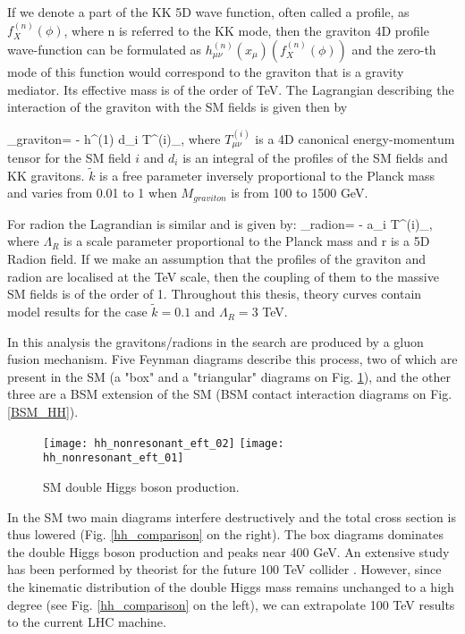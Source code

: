 If we denote a part of the KK 5D wave function, often called a profile, as $f^{(n)}_X(\phi)$, where n is referred to the KK mode, then the graviton 4D profile wave-function can be formulated as $h^{(n)}_{\mu\nu}(x_\mu)(f^{(n)}_X(\phi))$ and the zero-th mode of this function would correspond to the graviton that is a gravity mediator. Its effective mass is of the order of TeV. The Lagrangian describing the interaction of the graviton with the SM fields is given then by 

\beqn\label{lagr_Yuk}
\Lagr_{graviton}=  -  h^{\mu\nu(1)} \times d_i T^{(i)}_{\mu\nu},  
\eeqn
where $T^{(i)}_{\mu\nu}$ is a 4D canonical energy-momentum tensor \cite{Forger:2003ut} for the SM field $i$ and $d_i$ is an integral of the profiles of the SM fields and KK gravitons. $\tilde{k}$ is a free parameter inversely proportional to the Planck mass and varies from 0.01 to 1 when $M_{graviton}$ is from 100 to 1500 GeV. 

For radion the Lagrandian is similar and is given by:
\beqn\label{lagr_Yuk}
\Lagr_{radion}=  -  \times a_i T^{\mu (i)}_{\mu},  
\eeqn
where $\Lambda_R$ is a scale parameter proportional to the Planck mass and r is a 5D Radion field. If we make an assumption that the profiles of the graviton and radion are localised at the TeV scale, then the coupling of them to the massive SM fields is of the order of 1. Throughout this thesis, theory curves contain model results for the case $\tilde{k}=0.1$ and $\Lambda_R = 3 $ TeV.  

In this analysis the gravitons/radions in the search are produced by a gluon fusion mechanism. Five Feynman diagrams describe this process, two of which are present in the SM (a "box" and a "triangular" diagrams on Fig. \ref{SM_HH}), and the other three are a BSM extension of the SM (BSM contact interaction diagrams on Fig. \ref{BSM_HH}).   



\begin{figure}[H]
  \centering
    \texttt{[image: hh\_nonresonant\_eft\_02]}
     \texttt{[image: hh\_nonresonant\_eft\_01]}
    \caption{SM double Higgs boson production.}
    \label{SM_HH}
\end{figure}

In the SM two main diagrams interfere destructively and the total cross section is thus lowered (Fig. \ref{hh_comparison} on the right). The box diagrams dominates the double Higgs boson production and peaks near 400 GeV. An extensive study has been performed by theorist for the future 100 TeV collider \cite{Chen:2014xra,}. However, since the kinematic distribution of the double Higgs mass remains unchanged to a high degree (see Fig. \ref{hh_comparison} on the left), we can extrapolate 100 TeV results to the current LHC machine. 


